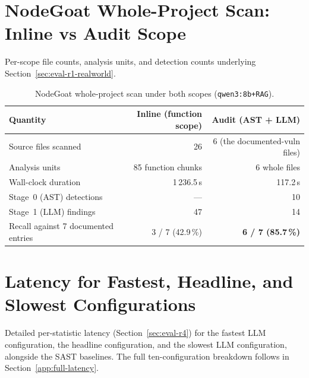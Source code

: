 \section{NodeGoat Whole-Project Scan: Inline vs Audit Scope}
\label{app:r1-realworld-nodegoat}

Per-scope file counts, analysis units, and detection counts underlying Section~\ref{sec:eval-r1-realworld}.

\begin{table}[H]
\centering
\caption{NodeGoat whole-project scan under both scopes (\texttt{qwen3:8b+RAG}).}
\label{tab:r1-realworld-nodegoat-app}
\footnotesize
\begin{tabular}{@{}lrr@{}}
\toprule
\textbf{Quantity} & \textbf{Inline (function scope)} & \textbf{Audit (AST + LLM)} \\
\midrule
Source files scanned                   & 26                & 6 (the documented-vuln files)\\
Analysis units                         & 85 function chunks & 6 whole files \\
Wall-clock duration                    & 1\,236.5\,s       & 117.2\,s \\
Stage~0 (AST) detections               & ---               & 10 \\
Stage~1 (LLM) findings                 & 47                & 14 \\
Recall against 7 documented entries    & 3 / 7 (42.9\,\%)  & \textbf{6 / 7 (85.7\,\%)} \\
\bottomrule
\end{tabular}
\end{table}

\section{Latency for Fastest, Headline, and Slowest Configurations}
\label{app:r4-latency}

Detailed per-statistic latency (Section~\ref{sec:eval-r4}) for the fastest LLM configuration, the headline configuration, and the slowest LLM configuration, alongside the SAST baselines. The full ten-configuration breakdown follows in Section~\ref{app:full-latency}.

